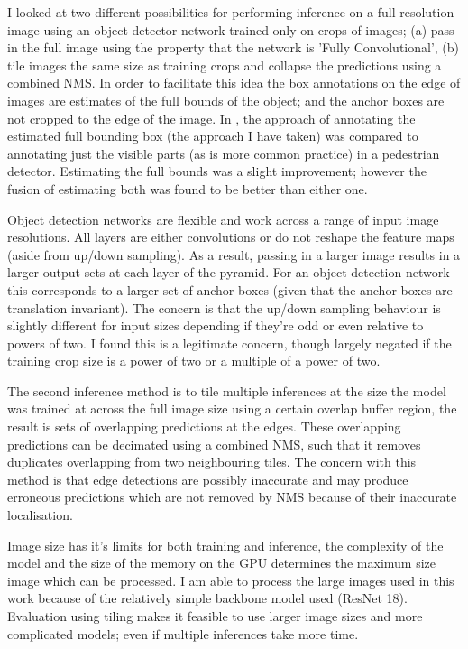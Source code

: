 I looked at two different possibilities for performing inference on a full resolution image using an object detector network trained only on crops of images; (a) pass in the full image using the property that the network is 'Fully Convolutional', (b) tile images the same size as training crops and collapse the predictions using a combined \gls{NMS}. In order to facilitate this idea the box annotations on the edge of images are estimates of the full bounds of the object; and the anchor boxes are not cropped to the edge of the image. In \cite{Duarte2010}, the approach of annotating the estimated full bounding box (the approach I have taken) was compared to annotating just the visible parts (as is more common practice) in a pedestrian detector. Estimating the full bounds was a slight improvement; however the fusion of estimating both was found to be better than either one. 

Object detection networks are flexible and work across a range of input image resolutions. All layers are either convolutions or do not reshape the feature maps (aside from up/down sampling). As a result, passing in a larger image results in a larger output sets at each layer of the pyramid. For an object detection network this corresponds to a larger set of anchor boxes (given that the anchor boxes are translation invariant). The concern is that the up/down sampling behaviour is slightly different for input sizes depending if they're odd or even relative to powers of two. I found this is a legitimate concern, though largely negated if the training crop size is a power of two or a multiple of a power of two. 

The second inference method is to tile multiple inferences at the size the model was trained at across the full image size using a certain overlap buffer region, the result is sets of overlapping predictions at the edges. These overlapping predictions can be decimated using a combined \gls{NMS}, such that it removes duplicates overlapping from two neighbouring tiles. The concern with this method is that edge detections are possibly inaccurate and may produce erroneous predictions which are not removed by \gls{NMS} because of their inaccurate localisation. 

Image size has it's limits for both training and inference, the complexity of the model and the size of the memory on the \gls{GPU} determines the maximum size image which can be processed. I am able to process the large images used in this work because of the relatively simple backbone model used (ResNet 18). Evaluation using tiling makes it feasible to use larger image sizes and more complicated models; even if multiple inferences take more time.


